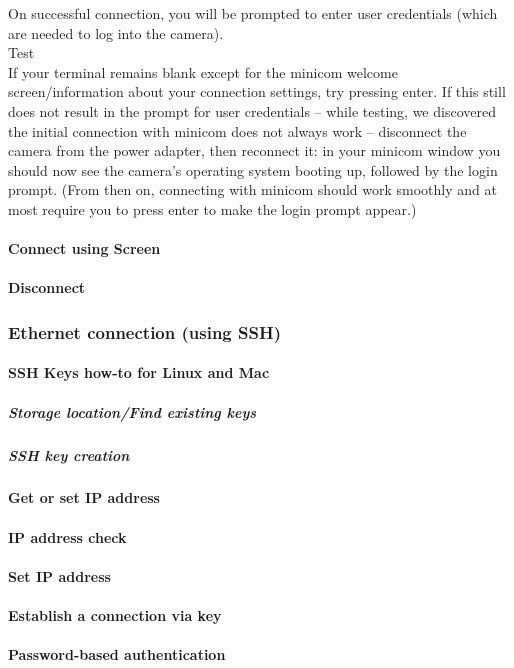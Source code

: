 On successful connection, you will be prompted to enter user credentials (which are needed to log into the camera).\\

Test\\

If your terminal remains blank except for the minicom welcome screen/information about your connection settings, try pressing enter. If this still does not result in the prompt for user credentials – while testing, we discovered the initial connection with minicom does not always work – disconnect the camera from the power adapter, then reconnect it: in your minicom window you should now see the camera's operating system booting up, followed by the login prompt. (From then on, connecting with minicom should work smoothly and at most require you to press enter to make the login prompt appear.)

\paragraph{Connect using Screen}
\paragraph{Disconnect}
\subsubsection{Ethernet connection (using SSH)}
\paragraph{SSH Keys how-to for Linux and Mac}
\subparagraph{Storage location/Find existing keys}
\subparagraph{SSH key creation}
\paragraph{Get or set IP address}
\paragraph{IP address check}
\paragraph{Set IP address}
\paragraph{Establish a connection via key}
\paragraph{Password-based authentication}
